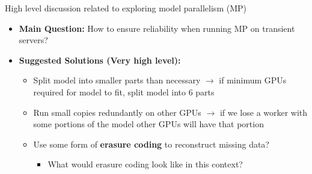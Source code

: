 \vspace{1em}
High level discussion related to exploring model parallelism (MP)
\begin{itemize}
    \item \textbf{Main Question:} How to ensure reliability when running MP on
      transient servers?
    \item \textbf{Suggested Solutions (Very high level):}
    \begin{itemize}
        \item Split model into smaller parts than necessary $\rightarrow$
          if minimum GPUs required for model to fit, split model into 6 parts
        \item Run small copies redundantly on other GPUs $\rightarrow$ if we
          lose a worker with some portions of the model other GPUs will have that
          portion
        \item Use some form of \textbf{erasure coding} to reconstruct missing data?
        \begin{itemize}
            \item What would erasure coding look like in this context?
        \end{itemize}
    \end{itemize}
\end{itemize}
